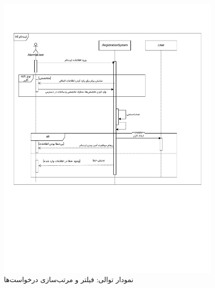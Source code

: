 \begin{figure}[ht!]
	\centering
	\includegraphics[scale=0.6, page=9]{figs/OOD-Sequence-1.pdf}
	\caption{نمودار توالی: فیلتر و مرتب‌سازی درخواست‌ها}
\end{figure}
\FloatBarrier
\newpage

